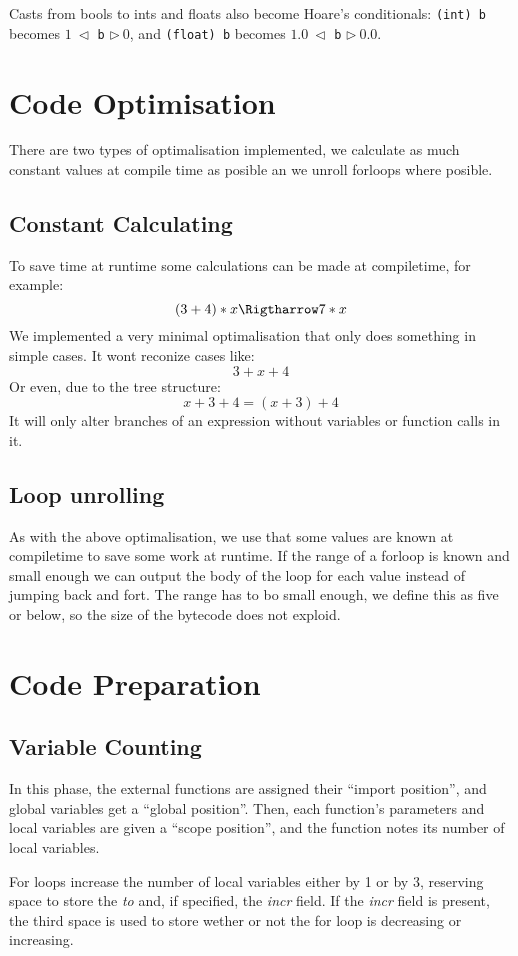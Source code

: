 \documentclass[a4paper,11pt]{report}
\begin{document}
Casts from bools to ints and floats also become Hoare's conditionals: \texttt{(int) b} becomes $1~\triangleleft$ \texttt{b} $\triangleright~0$, and \texttt{(float) b} becomes $1.0~\triangleleft$ \texttt{b} $\triangleright~0.0$.

\section{Code Optimisation}
There are two types of optimalisation implemented, we calculate as much constant values at compile time as posible an we unroll forloops where posible.
\subsection{Constant Calculating}
To save time at runtime some calculations can be made at compiletime, for example:
\[
(3+4)*x \Rigtharrow 7*x
\]
We implemented a very minimal optimalisation that only does something in simple cases.
It wont reconize cases like:
\[
3+x+4
\]
Or even, due to the tree structure:
\[
x+3+4 = (x+3)+4
\]
It will only alter branches of an expression without variables or function calls in it.
\subsection{Loop unrolling}
As with the above optimalisation, we use that some values are known at compiletime to save some work at runtime.
If the range of a forloop is known and small enough we can output the body of the loop for each value instead of jumping back and fort.
The range has to bo small enough, we define this as five or below, so the size of the bytecode does not exploid.


\section{Code Preparation}
\subsection{Variable Counting}
In this phase, the external functions are assigned their ``import position'', and global variables get a ``global position''. Then, each function's parameters and local variables are given a ``scope position'', and the function notes its number of local variables. 

For loops increase the number of local variables either by 1 or by 3, reserving space to store the \emph{to} and, if specified, the \emph{incr} field. If the \emph{incr} field is present, the third space is used to store wether or not the for loop is decreasing or increasing.
\end{document}
